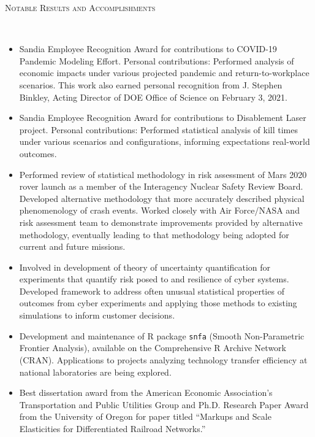 \documentclass[11pt]{article}
\newenvironment{changemargin}[2]{%
  \begin{list}{}{%
    \setlength{\topsep}{0pt}%
    \setlength{\leftmargin}{#1}%
    \setlength{\rightmargin}{#2}%
    \setlength{\listparindent}{\parindent}%
    \setlength{\itemindent}{\parindent}%
    \setlength{\parsep}{\parskip}%
  }%
  \item[]}{\end{list}
}
\newcommand{\lineover}{
	\begin{changemargin}{-0.05in}{-0.05in}
		\vspace*{-8pt}
		\hrulefill \\
		\vspace*{-2pt}
	\end{changemargin}
}
\newcommand{\header}[1]{
	\begin{changemargin}{-0.5in}{-0.5in}
		\scshape{#1}\\
	\vspace*{-5pt}
  	\lineover
	\end{changemargin}
}
\newenvironment{body} {
	\vspace*{-16pt}
	\begin{changemargin}{-0.25in}{-0.5in}
  }	
	{\end{changemargin}
}
\begin{document}
\smallskip
\header{Notable Results and Accomplishments}
\begin{body}
	\vspace{14pt}
	\begin{itemize}
		\item Sandia Employee Recognition Award for contributions to COVID-19 Pandemic Modeling Effort. Personal contributions: Performed analysis of economic impacts under various projected pandemic and return-to-workplace scenarios. This work also earned personal recognition from J. Stephen Binkley, Acting Director of DOE Office of Science on February 3, 2021.
		\item Sandia Employee Recognition Award for contributions to Disablement Laser project. Personal contributions: Performed statistical analysis of kill times under various scenarios and configurations, informing expectations real-world outcomes.
		\item Performed review of statistical methodology in risk assessment of Mars 2020 rover launch as a member of the Interagency Nuclear Safety Review Board. Developed alternative methodology that more accurately described physical phenomenology of crash events. Worked closely with Air Force/NASA and risk assessment team to demonstrate improvements provided by alternative methodology, eventually leading to that methodology being adopted for current and future missions.
		\item Involved in development of theory of uncertainty quantification for experiments that quantify risk posed to and resilience of cyber systems. Developed framework to address often unusual statistical properties of outcomes from cyber experiments and applying those methods to existing simulations to inform customer decisions.
		\item Development and maintenance of R package \texttt{snfa} (Smooth Non-Parametric Frontier Analysis), available on the Comprehensive R Archive Network (CRAN). Applications to projects analyzing technology transfer efficiency at national laboratories are being explored.
		\item Best dissertation award from the American Economic Association's Transportation and Public Utilities Group and Ph.D. Research Paper Award from the University of Oregon for paper titled ``Markups and Scale Elasticities for Differentiated Railroad Networks.''
	\end{itemize}
\end{body}
\end{document}
